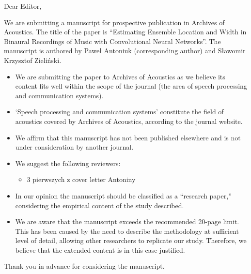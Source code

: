 \documentclass[a4paper,12pt]{article}
\begin{document}


Dear Editor,

We are submitting a manuscript for prospective publication in Archives of Acoustics. The title of the paper is ``Estimating Ensemble Location and Width in Binaural Recordings of Music with Convolutional Neural Networks''. The manuscript is authored by Paweł Antoniuk (corresponding author) and Sławomir Krzysztof Zieliński.
\begin{itemize}
    \item We are submitting the paper to Archives of Acoustics as we believe its content fits well within the scope of the journal (the area of speech processing and communication systems).
    \item ‘Speech processing and communication systems’ constitute the field of acoustics covered by Archives of Acoustics, according to the journal website.
    \item We affirm that this manuscript has not been published elsewhere and is not under consideration by another journal.
    \item We suggest the following reviewers:
          \begin{itemize}
              \item 3 pierwszych z cover letter Antoniny
          \end{itemize}
    \item In our opinion the manuscript should be classified as a ``research paper,'' considering the empirical content of the study described.
    \item We are aware that the manuscript exceeds the recommended 20-page limit. This has been caused by the need to describe the methodology at sufficient level of detail, allowing other researchers to replicate our study. Therefore, we believe that the extended content is in this case justified.
\end{itemize}

Thank you in advance for considering the manuscript.
\end{document}
